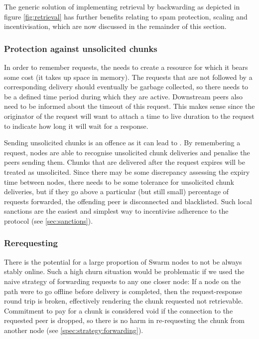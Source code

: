 The generic solution of implementing retrieval by backwarding as depicted in figure \ref{fig:retrieval} has further benefits relating to spam protection, scaling and incentivisation, which are now discussed in the remainder of this section.

\subsubsection{Protection against unsolicited chunks}

In order to remember requests, the  needs to create a resource for which it bears some cost (it takes up space in memory). The requests that are not followed by a corresponding delivery should eventually be garbage collected, so there needs to be a defined time period during which they are active. Downstream peers also need to be informed about the timeout of this request. This makes sense since the originator of the request will want to attach a time to live duration to the request to indicate how long it will wait for a response.  

Sending unsolicited chunks is an offence as it can lead to . By remembering a request, nodes are able to recognise unsolicited chunk deliveries and penalise the peers sending them. Chunks that are delivered after the request expires will be treated as unsolicited. Since there may be some discrepancy assessing the expiry time between nodes, there needs to be some tolerance for unsolicited chunk deliveries, but if they go above a particular (but still small) percentage of requests forwarded, the offending peer is disconnected and blacklisted. Such local sanctions are the easiest and simplest way to incentivise adherence to the protocol (see \ref{sec:sanctions}). 

\subsubsection{Rerequesting}

There is the potential for a large proportion of Swarm nodes to not be always stably online. Such a high churn situation would be problematic if we used the naive strategy of forwarding requests to any one closer node: If a node on the path were to go offline before delivery is completed, then the request-response round trip is broken, effectively rendering the chunk requested not retrievable. Commitment to pay for a chunk is considered void if the connection to the requested peer is dropped, so there is no harm in re-requesting the chunk from another node (see \ref{spec:strategy:forwarding}).


